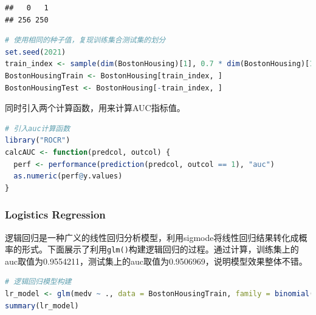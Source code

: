 \documentclass[]{ctexbook}
\newcommand{\passthrough}[1]{#1}
\begin{document}
\begin{lstlisting}
##   0   1 
## 256 250
\end{lstlisting}

\begin{lstlisting}[language=R]
# 使用相同的种子值，复现训练集合测试集的划分
set.seed(2021)
train_index <- sample(dim(BostonHousing)[1], 0.7 * dim(BostonHousing)[1])
BostonHousingTrain <- BostonHousing[train_index, ]
BostonHousingTest <- BostonHousing[-train_index, ]
\end{lstlisting}

同时引入两个计算函数，用来计算AUC指标值。

\begin{lstlisting}[language=R]
# 引入auc计算函数
library("ROCR")
calcAUC <- function(predcol, outcol) {
  perf <- performance(prediction(predcol, outcol == 1), "auc")
  as.numeric(perf@y.values)
}
\end{lstlisting}

\hypertarget{logistics-regression}{%
\subsubsection{Logistics Regression}\label{logistics-regression}}

逻辑回归是一种广义的线性回归分析模型，利用sigmode将线性回归结果转化成概率的形式。下面展示了利用\passthrough{\lstinline!glm()!}构建逻辑回归的过程。通过计算，训练集上的auc取值为0.9554211，测试集上的auc取值为0.9506969，说明模型效果整体不错。

\begin{lstlisting}[language=R]
# 逻辑回归模型构建
lr_model <- glm(medv ~ ., data = BostonHousingTrain, family = binomial(link = "logit"))
summary(lr_model)
\end{lstlisting}
\end{document}
